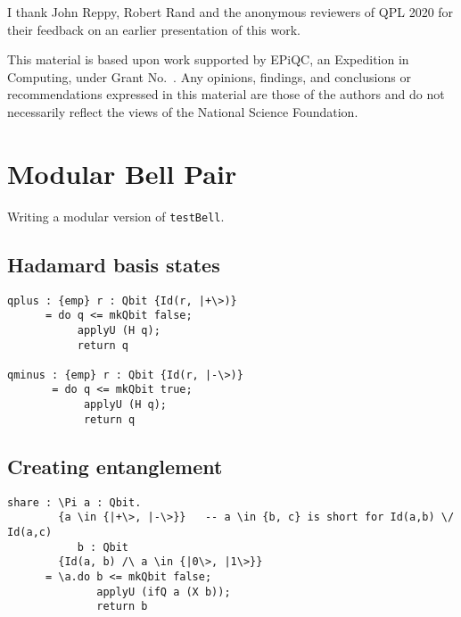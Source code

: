 \documentclass[acmsmall,nonacm,timestamp,review=false,anonymous=false]{acmart}
\newcommand{\qwire}{\ensuremath{\mathcal{Q}\textsc{wire}}\xspace}
\begin{document}

\begin{acks}
	I thank John Reppy, Robert Rand and the anonymous reviewers of QPL 2020 for their feedback on an earlier presentation of this work.

	This material is based upon work supported by
	EPiQC, an 
	Expedition in Computing, under Grant
	No.~.  Any opinions, findings, and
	conclusions or recommendations expressed in this material are those
	of the authors and do not necessarily reflect the views of the
	National Science Foundation.
\end{acks}

\newpage



\newpage

\newpage

\appendix

\section{Modular Bell Pair}
\label{app:mbp}
Writing a modular version of \texttt{testBell}.

\subsection{Hadamard basis states}
\begin{lstlisting}[language=QHaskell]
qplus : {emp} r : Qbit {Id(r, |+\>)}
      = do q <= mkQbit false;
           applyU (H q);
           return q

qminus : {emp} r : Qbit {Id(r, |-\>)}
       = do q <= mkQbit true;
            applyU (H q);
            return q
\end{lstlisting}

\subsection{Creating entanglement}
\begin{lstlisting}[language=QHaskell]
share : \Pi a : Qbit.
        {a \in {|+\>, |-\>}}   -- a \in {b, c} is short for Id(a,b) \/ Id(a,c)
           b : Qbit
        {Id(a, b) /\ a \in {|0\>, |1\>}}
      = \a.do b <= mkQbit false;
              applyU (ifQ a (X b));
              return b
\end{lstlisting}
\end{document}
